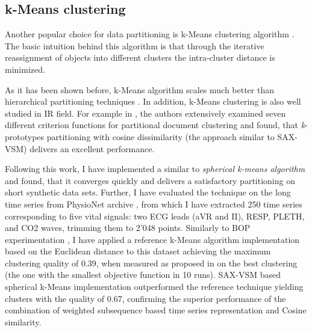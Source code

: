 \subsection{k-Means clustering}
Another popular choice for data partitioning is k-Means clustering algorithm \cite{kmeans}.
The basic intuition behind this algorithm is that through the iterative reassignment of objects 
into different clusters the intra-cluster distance is minimized. 

As it has been shown before, k-Means algorithm scales much better than hierarchical partitioning techniques 
\cite{citeulike:4195343}. In addition, k-Means clustering is also well studied in IR field. 
For example in \cite{citeulike:505248}, the authors extensively examined seven different criterion functions for 
partitional document clustering and found, that \textit{k}-prototypes partitioning with cosine dissimilarity 
(the approach similar to \mbox{SAX-VSM}) delivers an excellent performance. 

Following this work, I have implemented a similar to \cite{citeulike:1172599} \textit{spherical k-means algorithm}
and found, that it converges quickly and delivers a satisfactory partitioning on short synthetic data sets. 
Further, I have evaluated the technique on the long time series from PhysioNet archive \cite{citeulike:699487}, 
from which I have extracted 250 time series corresponding to five vital signals: 
two ECG leads (aVR and II), RESP, PLETH, and CO2 waves, trimming them to 2'048 points. 
Similarly to BOP experimentation \cite{citeulike:10525778}, I have applied a reference k-Means algorithm 
implementation based on the Euclidean distance \cite{R_software} \cite{hartigan1979} to this dataset achieving 
the maximum clustering quality of 0.39, when measured as proposed in \cite{citeulike:1325189} on the best clustering 
(the one with the smallest objective function in 10 runs). 
SAX-VSM based spherical k-Means implementation outperformed the reference technique yielding 
clusters  with the quality of 0.67, confirming the superior performance of the combination of weighted subsequence 
based time series representation and Cosine similarity.

